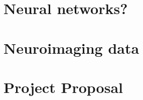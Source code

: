 \documentclass[12pt,a4paper,twoside, openright, hidelinks]{report}
\begin{document}



\appendix
\chapter{Neural networks?}

\chapter{Neuroimaging data}

\chapter{Project Proposal}
% 
% 
\end{document}
